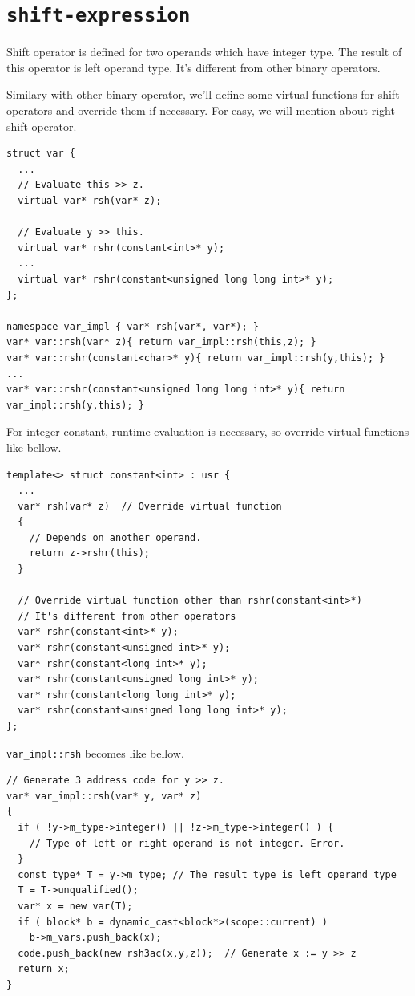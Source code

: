 \section{\tt{shift-expression}}
\label{expr_e026}
Shift operator is defined for two operands which have
integer type. The result of this operator is left operand
type. It's different from other binary operators.

Similary with other binary operator, we'll define some virtual
functions for shift operators and override them if necessary.
For easy, we will mention about right shift operator.
\begin{verbatim}
struct var {
  ...
  // Evaluate this >> z.
  virtual var* rsh(var* z);

  // Evaluate y >> this.
  virtual var* rshr(constant<int>* y);
  ...
  virtual var* rshr(constant<unsigned long long int>* y);
};

namespace var_impl { var* rsh(var*, var*); }
var* var::rsh(var* z){ return var_impl::rsh(this,z); }
var* var::rshr(constant<char>* y){ return var_impl::rsh(y,this); }
...
var* var::rshr(constant<unsigned long long int>* y){ return var_impl::rsh(y,this); }
\end{verbatim}
For integer constant, runtime-evaluation is necessary, so override
virtual functions like bellow.
\begin{verbatim}
template<> struct constant<int> : usr {
  ...
  var* rsh(var* z)  // Override virtual function
  {
    // Depends on another operand.
    return z->rshr(this);
  }

  // Override virtual function other than rshr(constant<int>*)
  // It's different from other operators
  var* rshr(constant<int>* y);
  var* rshr(constant<unsigned int>* y);
  var* rshr(constant<long int>* y);
  var* rshr(constant<unsigned long int>* y);
  var* rshr(constant<long long int>* y);
  var* rshr(constant<unsigned long long int>* y);
};
\end{verbatim}
{\tt{var\_impl::rsh}} becomes like bellow.
\begin{verbatim}
// Generate 3 address code for y >> z.
var* var_impl::rsh(var* y, var* z)
{
  if ( !y->m_type->integer() || !z->m_type->integer() ) {
    // Type of left or right operand is not integer. Error.
  }
  const type* T = y->m_type; // The result type is left operand type
  T = T->unqualified();
  var* x = new var(T);
  if ( block* b = dynamic_cast<block*>(scope::current) )
    b->m_vars.push_back(x);
  code.push_back(new rsh3ac(x,y,z));  // Generate x := y >> z
  return x;
}
\end{verbatim}

